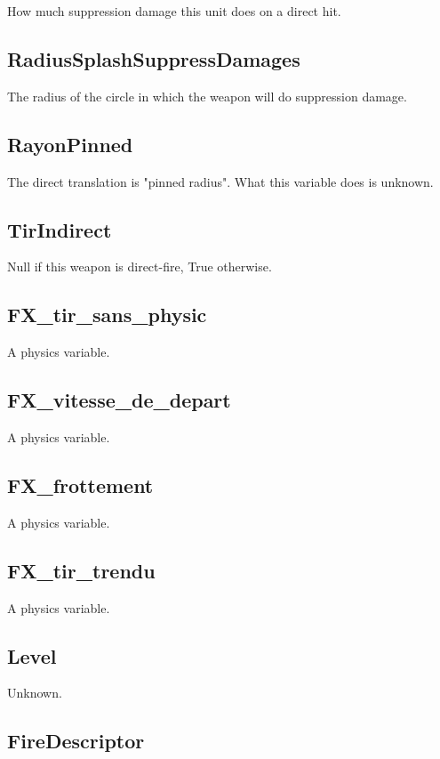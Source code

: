\documentclass{article}
\begin{document}
How much suppression damage this unit does on a direct hit.

\subsection{RadiusSplashSuppressDamages}

The radius of the circle in which the weapon will do suppression damage.

\subsection{RayonPinned}

The direct translation is "pinned radius". What this variable does is unknown.

\subsection{TirIndirect}

Null if this weapon is direct-fire, True otherwise.


\subsection{FX\_tir\_sans\_physic}

A physics variable.

\subsection{FX\_vitesse\_de\_depart}

A physics variable.

\subsection{FX\_frottement}

A physics variable.

\subsection{FX\_tir\_trendu}

A physics variable.

\subsection{Level}

Unknown.

\subsection{FireDescriptor}
\end{document}
